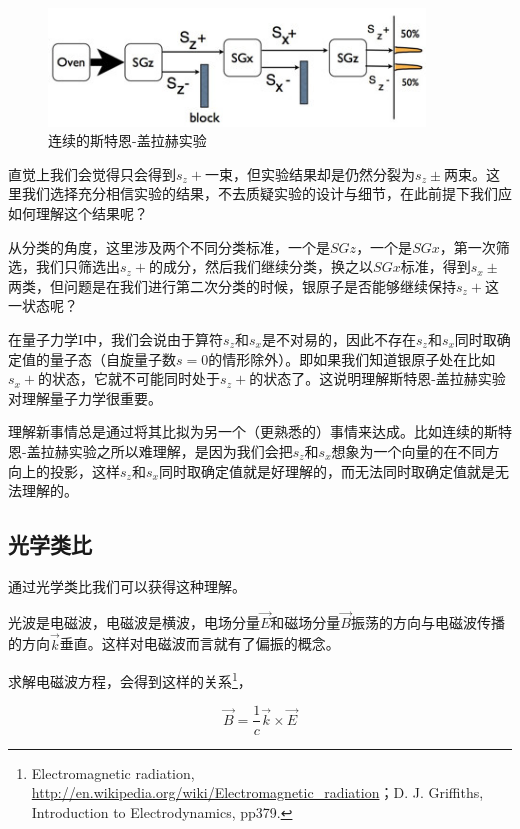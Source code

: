 \begin{figure}[htbp]
\begin{center}
\includegraphics[width=10cm]{SGExperiment/SequentialSGE.jpg}
\caption{连续的斯特恩-盖拉赫实验}
\end{center}
\end{figure}

直觉上我们会觉得只会得到$s_z +$一束，但实验结果却是仍然分裂为$s_z \pm$两束。这里我们选择充分相信实验的结果，不去质疑实验的设计与细节，在此前提下我们应如何理解这个结果呢？

从分类的角度，这里涉及两个不同分类标准，一个是$SGz$，一个是$SGx$，第一次筛选，我们只筛选出$s_z +$的成分，然后我们继续分类，换之以$SGx$标准，得到$s_x \pm$两类，但问题是在我们进行第二次分类的时候，银原子是否能够继续保持$s_z +$这一状态呢？

在量子力学I中，我们会说由于算符$s_z$和$s_x$是不对易的，因此不存在$s_z$和$s_x$同时取确定值的量子态（自旋量子数$s=0$的情形除外）。即如果我们知道银原子处在比如$s_x +$的状态，它就不可能同时处于$s_z +$的状态了。这说明理解斯特恩-盖拉赫实验对理解量子力学很重要。

理解新事情总是通过将其比拟为另一个（更熟悉的）事情来达成。比如连续的斯特恩-盖拉赫实验之所以难理解，是因为我们会把$s_z$和$s_x$想象为一个向量的在不同方向上的投影，这样$s_z$和$s_x$同时取确定值就是好理解的，而无法同时取确定值就是无法理解的。

\subsection{光学类比}

通过光学类比我们可以获得这种理解。

光波是电磁波，电磁波是横波，电场分量$\vec E$和磁场分量$\vec B$振荡的方向与电磁波传播的方向$\vec k$垂直。这样对电磁波而言就有了偏振的概念。

求解电磁波方程，会得到这样的关系\footnote{Electromagnetic radiation, \url{http://en.wikipedia.org/wiki/Electromagnetic_radiation}；D. J. Griffiths, Introduction to Electrodynamics, pp379.}，

\begin{equation}
\vec B = \frac{1}{c} \vec k \times \vec E 
\end{equation}

